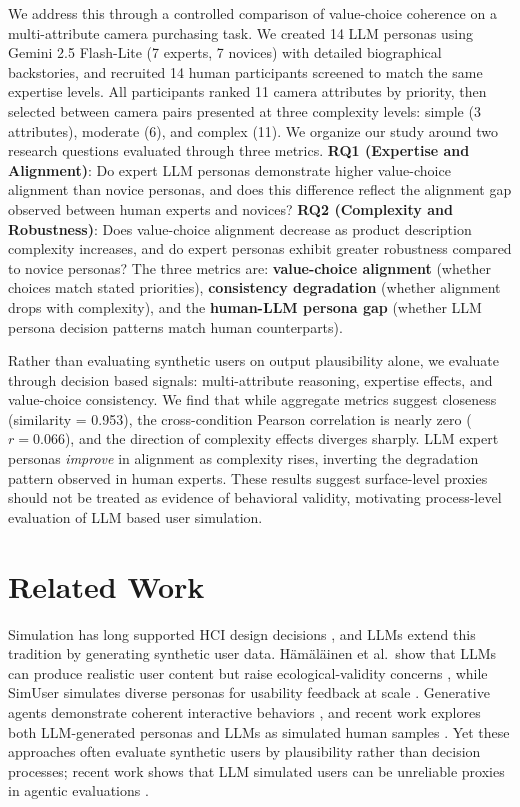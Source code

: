 \documentclass[manuscript,review]{acmart}
\begin{document}
We address this through a controlled comparison of value-choice coherence on a multi-attribute camera purchasing task. We created 14 LLM personas using Gemini 2.5 Flash-Lite (7 experts, 7 novices) with detailed biographical backstories, and recruited 14 human participants screened to match the same expertise levels. All participants ranked 11 camera attributes by priority, then selected between camera pairs presented at three complexity levels: simple (3 attributes), moderate (6), and complex (11). We organize our study around two research questions evaluated through three metrics. \textbf{RQ1 (Expertise and Alignment)}: Do expert LLM personas demonstrate higher value-choice alignment than novice personas, and does this difference reflect the alignment gap observed between human experts and novices? \textbf{RQ2 (Complexity and Robustness)}: Does value-choice alignment decrease as product description complexity increases, and do expert personas exhibit greater robustness compared to novice personas? The three metrics are: \textbf{value-choice alignment} (whether choices match stated priorities), \textbf{consistency degradation} (whether alignment drops with complexity), and the \textbf{human-LLM persona gap} (whether LLM persona decision patterns match human counterparts).

Rather than evaluating synthetic users on output plausibility alone, we evaluate through decision based signals: multi-attribute reasoning, expertise effects, and value-choice consistency. We find that while aggregate metrics suggest closeness (similarity = 0.953), the cross-condition Pearson correlation is nearly zero ($r = 0.066$), and the direction of complexity effects diverges sharply. LLM expert personas \emph{improve} in alignment as complexity rises, inverting the degradation pattern observed in human experts. These results suggest surface-level proxies should not be treated as evidence of behavioral validity, motivating process-level evaluation of LLM based user simulation.

\section{Related Work}
Simulation has long supported HCI design decisions \cite{murraysmith2022simulation}, and LLMs extend this tradition by generating synthetic user data. H\"am\"al\"ainen et al.\ show that LLMs can produce realistic user content but raise ecological-validity concerns \cite{hamalainen2023synthetichci}, while SimUser simulates diverse personas for usability feedback at scale \cite{xiang2024simuser}. Generative agents demonstrate coherent interactive behaviors \cite{park2023generativeagents}, and recent work explores both LLM-generated personas and LLMs as simulated human samples \cite{schuller2024generating, aher2023usinglargelanguagemodels}. Yet these approaches often evaluate synthetic users by plausibility rather than decision processes; recent work shows that LLM simulated users can be unreliable proxies in agentic evaluations \cite{lostinsimulation2024, salminen2025syntheticusers}.
\end{document}
